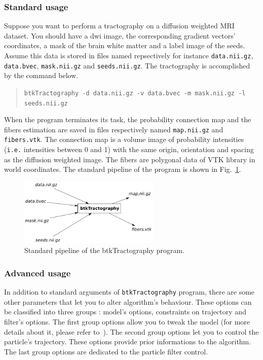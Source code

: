     \subsubsection*{Standard usage}
        Suppose you want to perform a tractography on a diffusion weighted MRI dataset. You should have a dwi image, the corresponding gradient vectors' coordinates, a mask of the brain white matter and a label image of the seeds. Assume this data is stored in files named repsectively for instance \texttt{data.nii.gz}, \texttt{data.bvec}, \texttt{mask.nii.gz} and \texttt{seeds.nii.gz}. The tractography is accomplished by the command below.
            \begin{quote}
                \texttt{btkTractography -d data.nii.gz -v data.bvec -m mask.nii.gz -l seeds.nii.gz}
            \end{quote}
        When the program terminates its task, the probability connection map and the fibers estimation are saved in files respectively named \texttt{map.nii.gz} and \texttt{fibers.vtk}. The connection map is a volume image of probability intensities (\texttt{i.e.} intensities between 0 and 1) with the same origin, orientation and spacing as the diffusion weighted image. The fibers are polygonal data of VTK library in world coordinates. The standard pipeline of the program is shown in Fig.~\ref{btkTractography-fig:standard-pipeline}.
            \begin{figure}
                \centering
                \includegraphics[width=0.6\textwidth]{btkTractographyPipeline}
                \caption{Standard pipeline of the btkTractography program.}
                \label{btkTractography-fig:standard-pipeline}
            \end{figure}

    \subsubsection*{Advanced usage}
        In addition to standard arguments of \texttt{btkTractography} program, there are some other parameters that let you to alter algorithm's behaviour. These options can be classified into three groups : model's options, constraints on trajectory and filter's options. The first group options allow you to tweak the model (for more details about it, please refer to~\cite{descoteaux_regularized_2007}). The second group options let you to control the particle's trajectory. These options provide prior informations to the algorithm. The last group options are dedicated to the particle filter control.

